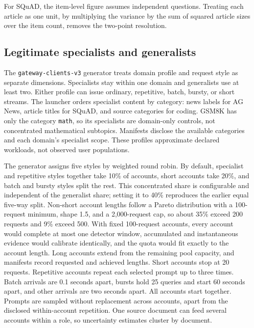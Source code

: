 \documentclass[journal]{IEEEtran}
\begin{document}
For SQuAD, the item-level figure assumes independent questions. Treating each article as one unit, by multiplying the variance by the sum of squared article sizes over the item count, removes the two-point resolution.

\subsection{Legitimate specialists and generalists}
\label{sec:benign}
The \texttt{gateway-clients-v3} generator treats domain profile and request style as separate dimensions. Specialists stay within one domain and generalists use at least two. Either profile can issue ordinary, repetitive, batch, bursty, or short streams. The launcher orders specialist content by category: news labels for AG News, article titles for SQuAD, and source categories for coding. GSM8K has only the category \texttt{math}, so its specialists are domain-only controls, not concentrated mathematical subtopics. Manifests disclose the available categories and each domain's specialist scope. These profiles approximate declared workloads, not observed user populations.

The generator assigns five styles by weighted round robin. By default, specialist and repetitive styles together take 10\% of accounts, short accounts take 20\%, and batch and bursty styles split the rest. This concentrated share is configurable and independent of the generalist share; setting it to 40\% reproduces the earlier equal five-way split. Non-short account lengths follow a Pareto distribution with a 100-request minimum, shape 1.5, and a 2,000-request cap, so about 35\% exceed 200 requests and 9\% exceed 500. With fixed 100-request accounts, every account would complete at most one detector window, accumulated and instantaneous evidence would calibrate identically, and the quota would fit exactly to the account length. Long accounts extend from the remaining pool capacity, and manifests record requested and achieved lengths. Short accounts stop at 20 requests. Repetitive accounts repeat each selected prompt up to three times. Batch arrivals are 0.1 seconds apart, bursts hold 25 queries and start 60 seconds apart, and other arrivals are two seconds apart. All accounts start together. Prompts are sampled without replacement across accounts, apart from the disclosed within-account repetition. One source document can feed several accounts within a role, so uncertainty estimates cluster by document.
\end{document}
